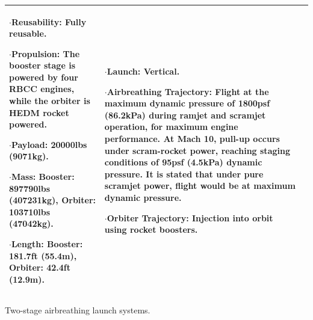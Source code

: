 {\begin{landscape}
\begin{xltabular}{\linewidth}{|X|X|X|}
	$\cdot$\textbf{Reusability:} Fully reusable. 
	
	$\cdot$\textbf{Propulsion:} The booster stage is powered by four RBCC engines, while the orbiter is HEDM rocket powered. 
	
	$\cdot$\textbf{Payload:} 20000lbs (9071kg).
	
	$\cdot$\textbf{Mass:} Booster: 897790lbs (407231kg), Orbiter: 103710lbs (47042kg).  
	
	$\cdot$\textbf{Length:} Booster: 181.7ft (55.4m), Orbiter: 42.4ft (12.9m).
	&\small
	
	$\cdot$\textbf{Launch:} Vertical.
	
	$\cdot$\textbf{Airbreathing Trajectory:} Flight at the maximum dynamic pressure of 1800psf (86.2kPa) during ramjet and scramjet operation, for maximum engine performance. 
	At Mach 10, pull-up occurs under scram-rocket power, reaching staging conditions of 95psf (4.5kPa) dynamic pressure. It is stated that under pure scramjet power, flight would be at maximum dynamic pressure. 
	
	$\cdot$\textbf{Orbiter Trajectory:} Injection into orbit using rocket boosters. 
	

	\\
\hline 
\end{xltabular} 


\begin{table}[H]
	
	\label{tab:twostage}
	\caption{Two-stage airbreathing launch systems.}
\end{table}

\end{landscape}
}

